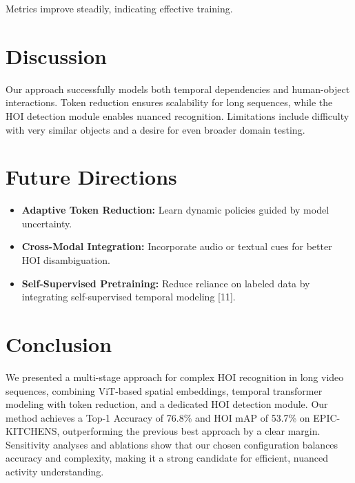 \documentclass{article}
\begin{document}
Metrics improve steadily, indicating effective training.

\section{Discussion}
Our approach successfully models both temporal dependencies and human-object interactions. Token reduction ensures scalability for long sequences, while the HOI detection module enables nuanced recognition. Limitations include difficulty with very similar objects and a desire for even broader domain testing.

\section{Future Directions}
\begin{itemize}
    \item \textbf{Adaptive Token Reduction:} Learn dynamic policies guided by model uncertainty.
    \item \textbf{Cross-Modal Integration:} Incorporate audio or textual cues for better HOI disambiguation.
    \item \textbf{Self-Supervised Pretraining:} Reduce reliance on labeled data by integrating self-supervised temporal modeling [11].
\end{itemize}

\section{Conclusion}
We presented a multi-stage approach for complex HOI recognition in long video sequences, combining ViT-based spatial embeddings, temporal transformer modeling with token reduction, and a dedicated HOI detection module. Our method achieves a Top-1 Accuracy of 76.8\% and HOI mAP of 53.7\% on EPIC-KITCHENS, outperforming the previous best approach by a clear margin. Sensitivity analyses and ablations show that our chosen configuration balances accuracy and complexity, making it a strong candidate for efficient, nuanced activity understanding.
\clearpage



\end{document}
